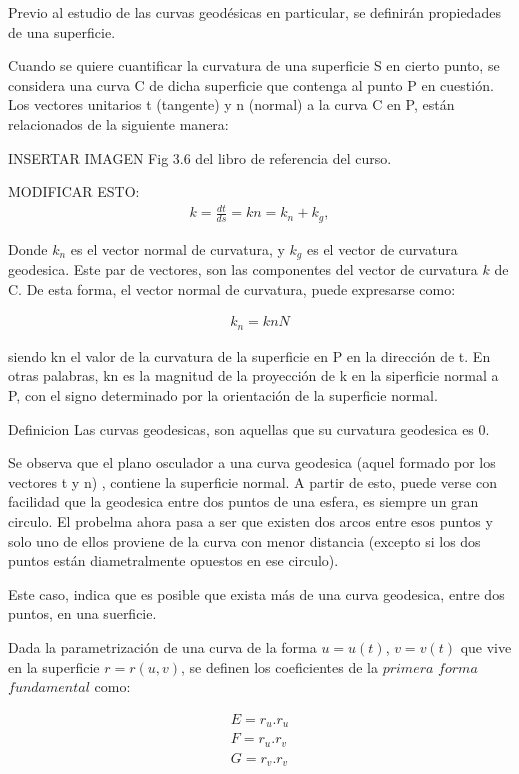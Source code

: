 \documentclass{endm}
\begin{document}
 
Previo al estudio de las curvas geod\'esicas en particular, se definir\'an propiedades de una superficie.

Cuando se quiere cuantificar la curvatura de una superficie S en cierto punto, se considera una curva C de dicha superficie que contenga al punto P en cuesti\'on. Los vectores unitarios t (tangente) y n (normal) a la curva C en P, est\'an relacionados de la siguiente manera:

INSERTAR IMAGEN Fig 3.6 del libro de referencia del curso.

MODIFICAR ESTO:
\begin{align} 
 k = \frac{dt}{ds} = k n = k_n + k_g, \label{eq1tangente}
\end{align}

Donde $k_n$ es el vector normal de curvatura, y $k_g$ es el vector de curvatura geodesica. Este par de vectores, son las componentes del vector de curvatura $k$ de C. De esta forma, el vector normal de curvatura, puede expresarse como:

\begin{align} 
 k_n = kn N \label{eq2tangente}
\end{align}

siendo kn el valor de la curvatura de la superficie en P en la direcci\'on de t.
En otras palabras, kn es la magnitud de la proyecci\'on de k en la siperficie normal a P, con el signo determinado por la orientaci\'on de la superficie normal.


Definicion
Las curvas geodesicas, son aquellas que su curvatura geodesica es 0.

Se observa que el plano osculador a una curva geodesica (aquel formado por los vectores t y n) , contiene la superficie normal. A partir de esto, puede verse con facilidad que la geodesica entre dos puntos de una esfera, es siempre un gran circulo. El probelma ahora pasa a ser que existen dos arcos entre esos puntos y solo uno de ellos proviene de la curva con menor distancia (excepto si los dos puntos est\'an diametralmente opuestos en ese circulo).

    Este caso, indica que es posible que exista m\'as de una curva geodesica, entre dos puntos, en una suerficie.


Dada la parametrizaci\'on de una curva de la forma $u=u(t)$, $v=v(t)$ que vive en la superficie $r=r(u,v)$, se definen los coeficientes de la $primera$ $forma$ $fundamental$ como:

\begin{align} 
E = r_u . r_u  \label{eqE}\\ 
F = r_u . r_v  \label{eqF} \\ 
G = r_v . r_v  \label{eqG}
\end{align}
    
\end{document}
